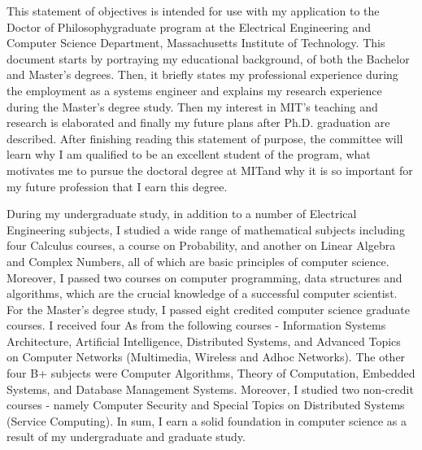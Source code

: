 \documentclass[a4paper,10pt]{report}
\newcommand{\university}{Massachusetts Institute of Technology}
\newcommand{\department}{Electrical Engineering and Computer Science Department}
\newcommand{\uniabbre}{MIT}
\newcommand{\degree}{Doctor of Philosophy}
\begin{document}

\vspace{0.4cm}
This statement of objectives is intended for use with my application to the \degree \space graduate program at the \department, \university. This document starts by portraying my educational background, of both the Bachelor and Master's degrees. Then, it briefly states my professional experience during the employment as a systems engineer and explains my research experience during the Master's degree study. Then my interest in \uniabbre's teaching and research is elaborated and finally my future plans after Ph.D. graduation are described. After finishing reading this statement of purpose, the committee will learn why I am qualified to be an excellent student of the program, what motivates me to pursue the doctoral degree at \uniabbre \space and why it is so important for my future profession that I earn this degree.

\vspace{0.2cm}
During my undergraduate study, in addition to a number of Electrical Engineering subjects, I studied a wide range of mathematical subjects including four Calculus courses, a course on Probability, and another on Linear Algebra and Complex Numbers, all of which are basic principles of computer science. Moreover, I passed two courses on computer programming, data structures and algorithms, which are the crucial knowledge of a successful computer scientist. For the Master's degree study, I passed eight credited computer science graduate courses. I received four As from the following courses - Information Systems Architecture, Artificial Intelligence, Distributed Systems, and Advanced Topics on Computer Networks (Multimedia, Wireless and Adhoc Networks). The other four B+ subjects were Computer Algorithms, Theory of Computation, Embedded Systems, and Database Management Systems. Moreover, I studied two non-credit courses - namely Computer Security and Special Topics on Distributed Systems (Service Computing). In sum, I earn a solid foundation in computer science as a result of my undergraduate and graduate study. 
\end{document}
